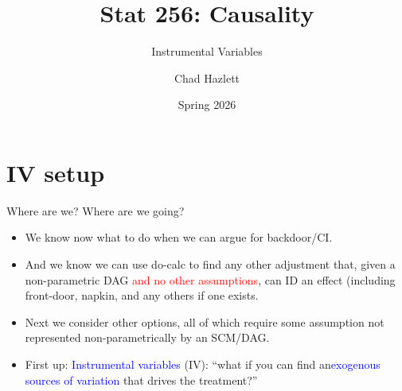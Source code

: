 \documentclass[xcolor=dvipsnames]{beamer}
\title{Stat 256: Causality}
\subtitle[ ]{Instrumental Variables}
\author{Chad Hazlett}
\date{Spring 2026}
\institute[UCLA]{UCLA\\[1ex]
  \texttt{chazlett@ucla.edu}}
\begin{document}
\subject{Talks}


\begin{frame}
  \titlepage
\end{frame}

\section{IV setup}\label{iv-setup}

\begin{frame}{Where are we? Where are we going?}

\begin{itemize}[<+->]
\small
\item
  We know now what to do when we can argue for backdoor/CI.
  \medskip
\item
  And we know we can use do-calc to find any other adjustment that, given a non-parametric DAG \textcolor{red}{and no other assumptions}, can ID an effect (including front-door, napkin, and any others if one exists.
    \medskip
\item
Next we consider other options, all of which require some assumption not represented non-parametrically by an SCM/DAG. 
\medskip
\item
First up: \textcolor{Blue}{Instrumental variables} (IV): ``what if you can find an\textcolor{Blue}{exogenous sources of variation} that drives the
  treatment?''
\end{itemize}
\end{frame}
\end{document}
